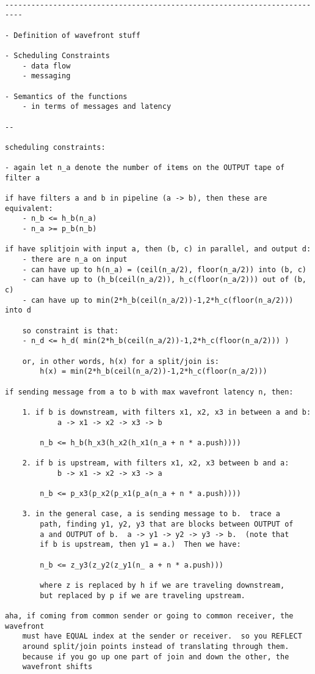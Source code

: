 \begin{verbatim}

--------------------------------------------------------------------------

- Definition of wavefront stuff

- Scheduling Constraints
	- data flow
	- messaging

- Semantics of the functions
	- in terms of messages and latency

--

scheduling constraints:

- again let n_a denote the number of items on the OUTPUT tape of filter a

if have filters a and b in pipeline (a -> b), then these are equivalent:
	- n_b <= h_b(n_a)
	- n_a >= p_b(n_b)

if have splitjoin with input a, then (b, c) in parallel, and output d:
	- there are n_a on input
	- can have up to h(n_a) = (ceil(n_a/2), floor(n_a/2)) into (b, c)
	- can have up to (h_b(ceil(n_a/2)), h_c(floor(n_a/2))) out of (b, c)
	- can have up to min(2*h_b(ceil(n_a/2))-1,2*h_c(floor(n_a/2))) into d

	so constraint is that:
	- n_d <= h_d( min(2*h_b(ceil(n_a/2))-1,2*h_c(floor(n_a/2))) )

	or, in other words, h(x) for a split/join is:
		h(x) = min(2*h_b(ceil(n_a/2))-1,2*h_c(floor(n_a/2)))

if sending message from a to b with max wavefront latency n, then:
	
	1. if b is downstream, with filters x1, x2, x3 in between a and b:
			a -> x1 -> x2 -> x3 -> b

		n_b <= h_b(h_x3(h_x2(h_x1(n_a + n * a.push))))

	2. if b is upstream, with filters x1, x2, x3 between b and a:
			b -> x1 -> x2 -> x3 -> a

		n_b <= p_x3(p_x2(p_x1(p_a(n_a + n * a.push))))

	3. in the general case, a is sending message to b.  trace a
		path, finding y1, y2, y3 that are blocks between OUTPUT of
		a and OUTPUT of b.  a -> y1 -> y2 -> y3 -> b.  (note that
		if b is upstream, then y1 = a.)  Then we have:

		n_b <= z_y3(z_y2(z_y1(n_ a + n * a.push)))

		where z is replaced by h if we are traveling downstream, 
		but replaced by p if we are traveling upstream.

aha, if coming from common sender or going to common receiver, the wavefront
	must have EQUAL index at the sender or receiver.  so you REFLECT
	around split/join points instead of translating through them.
	because if you go up one part of join and down the other, the
	wavefront shifts

\end{verbatim}


